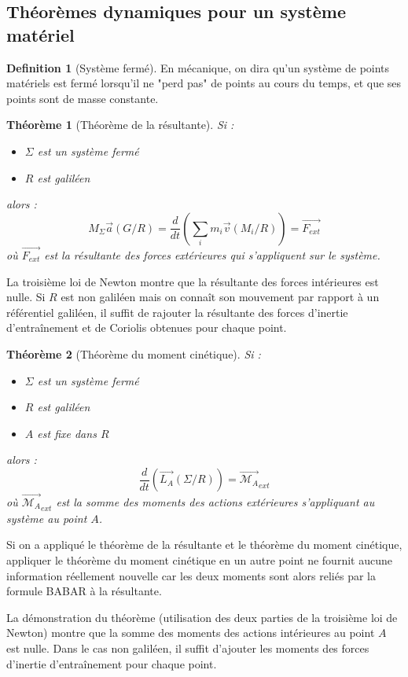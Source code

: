 \documentclass[french]{book}
\theoremstyle{plain}
\newtheorem{thm}{Théorème}
\theoremstyle{definition}
\newtheorem{dfn}{Definition}
\theoremstyle{remark}
\begin{document}
\subsection{Théorèmes dynamiques pour un système matériel}
\begin{dfn}[Système fermé]
	En mécanique, on dira qu'un système de points matériels est fermé lorsqu'il ne "perd pas" de points au cours du temps, et que ses points sont de masse constante.
\end{dfn}
\begin{thm}[Théorème de la résultante]
	Si : \begin{itemize}
		\item $\Sigma$ est un système fermé
		\item $R$ est galiléen
	\end{itemize} alors : $$M_\Sigma\overrightarrow{a}(G/R)=\frac{d}{dt}\left(\sum_i m_i\overrightarrow{v}(M_i/R)\right)=\overrightarrow{F_{ext}}$$ où $\overrightarrow{F_{ext}}$ est la résultante des forces extérieures qui s'appliquent sur le système.
\end{thm}
La troisième loi de Newton montre que la résultante des forces intérieures est nulle. Si $R$ est non galiléen mais on connaît son mouvement par rapport à un référentiel galiléen, il suffit de rajouter la résultante des forces d'inertie d'entraînement et de Coriolis obtenues pour chaque point.
\begin{thm}[Théorème du moment cinétique]
	Si : \begin{itemize}
		\item $\Sigma$ est un système fermé
		\item $R$ est galiléen
		\item $A$ est fixe dans $R$
	\end{itemize} alors : $$\frac{d}{dt}\left(\overrightarrow{L_A}(\Sigma/R)\right)=\overrightarrow{\mathcal{M}_A}_{ext}$$ où $\overrightarrow{\mathcal{M}_A}_{ext}$ est la somme des moments des actions extérieures s'appliquant au système au point $A$.
\end{thm}
Si on a appliqué le théorème de la résultante et le théorème du moment cinétique, appliquer le théorème du moment cinétique en un autre point ne fournit aucune information réellement nouvelle car les deux moments sont alors reliés par la formule BABAR à la résultante. \\ \par La démonstration du théorème (utilisation des deux parties de la troisième loi de Newton) montre que la somme des moments des actions intérieures au point $A$ est nulle. Dans le cas non galiléen, il suffit d'ajouter les moments des forces d'inertie d'entraînement pour chaque point.
\end{document}
